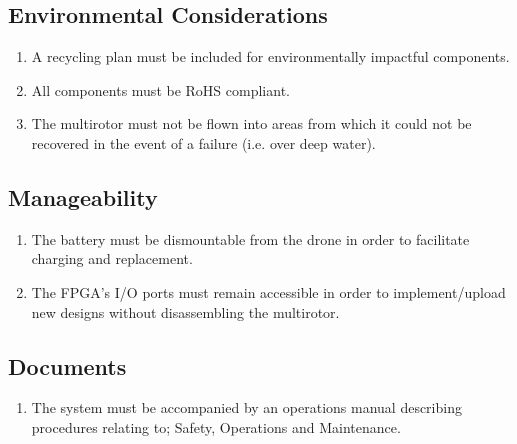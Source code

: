 \documentclass[10pt,letterpaper]{article}
\begin{document}
\subsection{Environmental Considerations}
\begin{enumerate}[label=C.EN.\arabic*, wide=1cm, widest=3cm, leftmargin=*, font=\bfseries, noitemsep,topsep=0pt, parsep=4pt, partopsep=0pt]
    \item A recycling plan must be included for environmentally impactful components.
    \item All components must be RoHS compliant.
    \item The multirotor must not be flown into areas from which it could not be recovered in the event of a failure (i.e. over deep water).
\end{enumerate}

\subsection{Manageability}
\begin{enumerate}[label=C.MG.\arabic*, wide=1cm, widest=3cm, leftmargin=*, font=\bfseries, noitemsep,topsep=0pt, parsep=4pt, partopsep=0pt]
    \item The battery must be dismountable from the drone in order to facilitate charging and replacement.
    \item The FPGA's I/O ports must remain accessible in order to implement/upload new designs without disassembling the multirotor.
\end{enumerate}

\subsection{Documents}
\begin{enumerate}[label=C.DD.\arabic*, wide=1cm, widest=3cm, leftmargin=*, font=\bfseries, noitemsep,topsep=0pt, parsep=4pt, partopsep=0pt]
    \item  The system must be accompanied by an operations manual describing procedures relating to; Safety, Operations and Maintenance.
\end{enumerate}

\clearpage
{}



\end{document}
